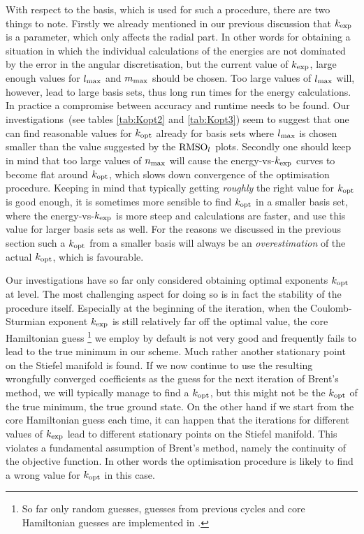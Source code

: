 With respect to the basis, which is used for such a procedure,
there are two things to note.
Firstly we already mentioned in our previous discussion
that $k_\text{exp}$ is a parameter,
which only affects the radial part.
In other words for obtaining a situation in which the individual
calculations of the energies
are not dominated by the error in the angular discretisation,
but the current value of $k_\text{exp}$,
large enough values for  $l_\text{max}$ and $m_\text{max}$ should be chosen.
Too large values of $l_\text{max}$ will, however, lead to large basis sets,
thus long run times for the energy calculations.
In practice a compromise between accuracy and runtime needs to be found.
Our investigations~(see tables \ref{tab:Kopt2} and \vref{tab:Kopt3})
seem to suggest that one can find reasonable values for $k_\text{opt}$
already for basis sets where $l_\text{max}$ is chosen smaller than
the value suggested by the $\text{RMSO}_l$ plots.
Secondly one should keep in mind that too large values of $n_\text{max}$
will cause the energy-vs-$k_\text{exp}$ curves to become flat around $k_\text{opt}$,
which slows down convergence of the optimisation procedure.
Keeping in mind that typically getting \emph{roughly} the
right value for $k_\text{opt}$ is good enough,
it is sometimes more sensible to find $k_\text{opt}$ in a smaller
basis set,
where the energy-vs-$k_\text{exp}$ is more steep and calculations are faster,
and use this value for larger basis sets as well.
For the reasons we discussed in the previous section
such a $k_\text{opt}$ from a smaller basis
will always be an \emph{overestimation} of the actual $k_\text{opt}$,
which is favourable.

Our investigations have so far only considered
obtaining optimal exponents $k_\text{opt}$ at \HF level.
The most challenging aspect for doing so is in fact the stability of the
\SCF procedure itself.
Especially at the beginning of the iteration,
when the Coulomb-Sturmian exponent $k_\text{exp}$ is still relatively
far off the optimal value, the core Hamiltonian guess%
\footnote{So far only random guesses, guesses from previous \SCF cycles
	and core Hamiltonian guesses are implemented in \molsturm.}
we employ by default is not very good and frequently
fails to lead to the true \SCF minimum in our \SCF scheme.
Much rather another stationary point on the \SCF Stiefel manifold is found.
If we now continue to use the resulting wrongfully converged \SCF coefficients
as the guess for the next iteration of Brent's method,
we will typically manage to find a $k_\text{opt}$,
but this might not be the $k_\text{opt}$ of the true \SCF minimum,
\ie the true \HF ground state.
On the other hand if we start from the core Hamiltonian guess each time,
it can happen that the \SCF iterations for different values of $k_\text{exp}$
lead to different stationary points on the Stiefel manifold.
This violates a fundamental assumption of Brent's method,
namely the continuity of the objective function.
In other words the optimisation procedure is likely to find
a wrong value for $k_\text{opt}$ in this case.

